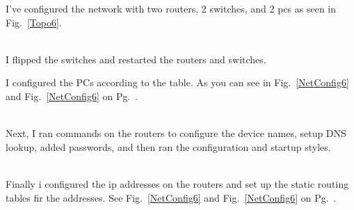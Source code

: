 \documentclass[../EngineeringJournal_CDavis.tex]{subfiles}
\begin{document}
\newpage

I've configured the network with two routers, 2 switches, and 2 pcs as seen in
Fig.~\ref{Topo6}.
\begin{figure}[!hbt]
  \centering
  \par
\end{figure}

\noindent{}
\\ I flipped the switches and restarted the routers and switches.


\noindent{}
I configured the PCs according to the table. As you can see in
Fig.~\ref{NetConfig6} and
Fig.~\ref{NetConfig6} on Pg.~\pageref{NetConfig6}.


\noindent{}
\\Next, I ran commands on the routers to configure the device names, setup DNS lookup,
added passwords, and then ran the configuration and startup styles.

\\ Finally i configured the ip addresses on the routers and set up the static routing
tables fir the addresses. See Fig.~\ref{NetConfig6} and
Fig.~\ref{NetConfig6} on Pg.~\pageref{NetConfig6}.
\end{document}
